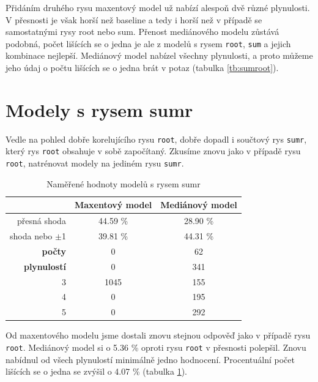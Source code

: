 \documentclass[12pt,a4paper]{report}
\begin{document}
Přidáním druhého rysu maxentový model už nabízí alespoň dvě různé plynulosti. V přesnosti je však horší než baseline a tedy i horší než v případě se samostatnými rysy root nebo sum. Přenost mediánového modelu zůstává podobná, počet lišících se o jedna je ale z modelů s rysem \texttt{root}, \texttt{sum} a jejich kombinace nejlepší. Mediánový model nabízel všechny plynulosti, a proto můžeme jeho údaj o počtu lišících se o jedna brát v potaz (tabulka \ref{tb:sumroot}).





\section{Modely s rysem sumr}
Vedle na pohled dobře korelujícího rysu \texttt{root}, dobře dopadl i součtový rys \texttt{sumr}, který rys \texttt{root} obsahuje v sobě započítaný. Zkusíme znovu jako v případě rysu \texttt{root}, natrénovat modely na jediném rysu \texttt{sumr}.

\begin{table}[!htbp]
\begin{center}
\begin{tabular}{|r|c|c|}
\hline
 & \textbf{Maxentový model} & \textbf{Mediánový model} \\
 \hline
 přesná shoda & 44.59 \%  & 28.90 \%  \\
\hline
shoda nebo $\pm$1 & 39.81 \% & 44.31 \%  \\
\hline
     \textbf{počty} \quad 1 & \color{red}0   & \color{OliveGreen}62   \\
\textbf{plynulostí} \quad 2 & \color{red}0 & \color{OliveGreen}341   \\
                          3 & 1045 & \color{OliveGreen}155 \\
                          4 & \color{red}0   & \color{OliveGreen}195 \\
                          5 & \color{red}0   & \color{OliveGreen}292  \\
\hline
\end{tabular}
\caption{Naměřené hodnoty modelů s rysem sumr}\label{tb:sumr}
\end{center}
\end{table}

Od maxentového modelu jsme dostali znovu stejnou odpověď jako v případě rysu \texttt{root}. Mediánový model si o 5.36 \% oproti rysu \texttt{root} v přesnosti polepšil. Znovu nabídnul od všech plynulostí minimálně jedno hodnocení. Procentuální počet lišících se o jedna se zvýšil o 4.07 \% (tabulka \ref{tb:sumr}).
\end{document}
